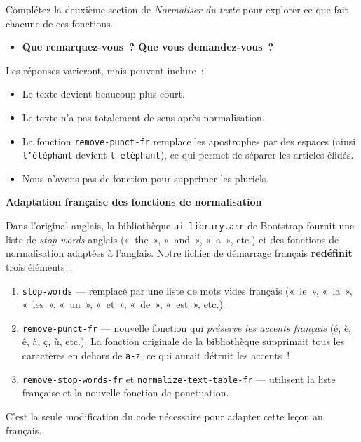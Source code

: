 \documentclass[12pt,a4paper]{article}
\begin{document}
\begin{activitybox}
  Complétez la deuxième section de \emph{Normaliser du texte} pour explorer ce que fait chacune de ces fonctions.
\end{activitybox}

\begin{thinkbox}
  \begin{itemize}
    \item \textbf{Que remarquez-vous~? Que vous demandez-vous~?}
  \end{itemize}

  Les réponses varieront, mais peuvent inclure~:
  \begin{itemize}
    \item Le texte devient beaucoup plus court.
    \item Le texte n'a pas totalement de sens après normalisation.
    \item La fonction \texttt{remove\allowbreak-punct\allowbreak-fr} remplace les apostrophes par des espaces (ainsi \texttt{l'éléphant} devient \texttt{l eléphant}), ce qui permet de séparer les articles élidés.
    \item Nous n'avons pas de fonction pour supprimer les pluriels.
  \end{itemize}
\end{thinkbox}

\begin{keypointbox}
  \textbf{Adaptation française des fonctions de normalisation}

  Dans l'original anglais, la bibliothèque \texttt{ai-library.arr} de Bootstrap fournit une liste de \emph{stop words} anglais («~the~», «~and~», «~a~», etc.) et des fonctions de normalisation adaptées à l'anglais. Notre fichier de démarrage français \textbf{redéfinit} trois éléments~:
  \begin{enumerate}
    \item \texttt{stop-words} — remplacé par une liste de mots vides français («~le~», «~la~», «~les~», «~un~», «~et~», «~de~», «~est~», etc.).
    \item\texttt{remove-punct-fr} — nouvelle fonction qui \emph{préserve les accents français} (é, è, ê, à, ç, ù, etc.). La fonction originale de la bibliothèque supprimait tous les caractères en dehors de \texttt{a-z}, ce qui aurait détruit les accents~!
    \item \texttt{remove-stop-words-fr} et \texttt{normalize\allowbreak-text\allowbreak-table-fr} — utilisent la liste française et la nouvelle fonction de ponctuation.
  \end{enumerate}
  C'est la seule modification du code nécessaire pour adapter cette leçon au français.
\end{keypointbox}
\end{document}
